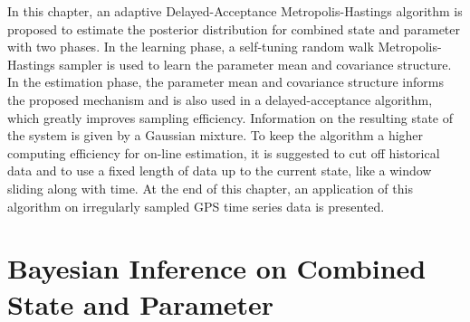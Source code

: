 In this chapter, an adaptive Delayed-Acceptance Metropolis-Hastings algorithm is proposed to estimate the posterior distribution for combined state and parameter with two phases. In the learning phase, a self-tuning random walk Metropolis-Hastings sampler is used to learn the parameter mean and covariance structure. In the estimation phase, the parameter mean and covariance structure informs the proposed mechanism and is also used in a delayed-acceptance algorithm, which greatly improves sampling efficiency. Information on the resulting state of the system is given by a Gaussian mixture. To keep the algorithm a higher computing efficiency for on-line estimation, it is suggested to cut off historical data and to use a fixed length of data up to the current state, like a window sliding along with time. At the end of this chapter, an application of this algorithm on irregularly sampled GPS time series data is presented. 

%



\section{Bayesian Inference on Combined State and Parameter}



